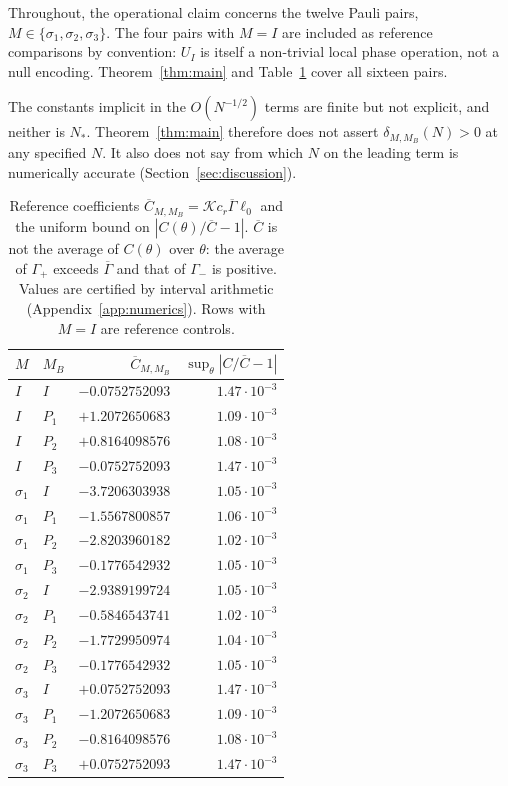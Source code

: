 \documentclass[11pt]{amsart}
\theoremstyle{definition}
\theoremstyle{remark}
\newcommand{\cK}{\mathcal{K}}
\begin{document}
Throughout, the operational claim concerns the twelve Pauli pairs,
$M\in\{\sigma_1,\sigma_2,\sigma_3\}$.  The four pairs with $M=I$ are
included as reference comparisons by convention: $U_I$ is itself a
non-trivial local phase operation, not a null encoding. Theorem~\ref{thm:main} and
Table~\ref{tab:C} cover all sixteen pairs.

The constants implicit in the $O(N^{-1/2})$ terms are finite but not
explicit, and neither is $N_*$.  Theorem~\ref{thm:main} therefore does not
assert $\delta_{M,M_B}(N)>0$ at any specified $N$.  It also does not say from
which $N$ on the leading term is numerically accurate
(Section~\ref{sec:discussion}).

\begin{table}[t]
\centering
\small
\begin{tabular}{llrr}
\toprule
$M$ & $M_B$ & $\overline C_{M,M_B}$ & $\sup_\theta|C/\overline C-1|$\\
\midrule
$I$ & $I$ & $-0.0752752093$ & $1.47\cdot10^{-3}$\\
$I$ & $P_1$ & $+1.2072650683$ & $1.09\cdot10^{-3}$\\
$I$ & $P_2$ & $+0.8164098576$ & $1.08\cdot10^{-3}$\\
$I$ & $P_3$ & $-0.0752752093$ & $1.47\cdot10^{-3}$\\
$\sigma_1$ & $I$ & $-3.7206303938$ & $1.05\cdot10^{-3}$\\
$\sigma_1$ & $P_1$ & $-1.5567800857$ & $1.06\cdot10^{-3}$\\
$\sigma_1$ & $P_2$ & $-2.8203960182$ & $1.02\cdot10^{-3}$\\
$\sigma_1$ & $P_3$ & $-0.1776542932$ & $1.05\cdot10^{-3}$\\
$\sigma_2$ & $I$ & $-2.9389199724$ & $1.05\cdot10^{-3}$\\
$\sigma_2$ & $P_1$ & $-0.5846543741$ & $1.02\cdot10^{-3}$\\
$\sigma_2$ & $P_2$ & $-1.7729950974$ & $1.04\cdot10^{-3}$\\
$\sigma_2$ & $P_3$ & $-0.1776542932$ & $1.05\cdot10^{-3}$\\
$\sigma_3$ & $I$ & $+0.0752752093$ & $1.47\cdot10^{-3}$\\
$\sigma_3$ & $P_1$ & $-1.2072650683$ & $1.09\cdot10^{-3}$\\
$\sigma_3$ & $P_2$ & $-0.8164098576$ & $1.08\cdot10^{-3}$\\
$\sigma_3$ & $P_3$ & $+0.0752752093$ & $1.47\cdot10^{-3}$\\
\bottomrule
\end{tabular}
\caption{Reference coefficients $\overline C_{M,M_B}=\cK c_r\overline\Gamma\ell_0$
and the uniform bound on $|C(\theta)/\overline C-1|$.  $\overline C$ is not
the average of $C(\theta)$ over $\theta$: the average of $\Gamma_+$ exceeds
$\overline\Gamma$ and that of $\Gamma_-$ is positive.  Values are
certified by interval arithmetic (Appendix~\ref{app:numerics}).  Rows with
$M=I$ are reference controls.}
\label{tab:C}
\end{table}
\end{document}
